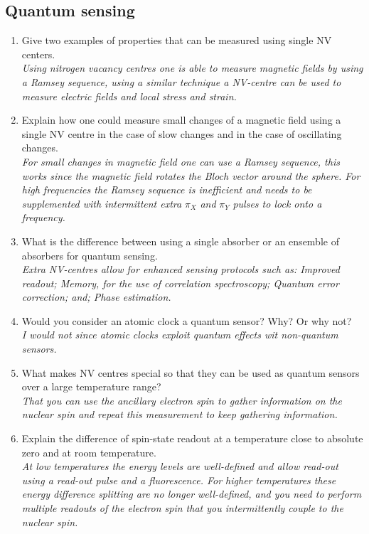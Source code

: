 \documentclass[a4paper]{scrartcl}
\newcommand{\qa}[2]{#1\\ \textit{#2}}
\begin{document}
\subsection*{Quantum sensing}
\begin{enumerate}[label=(\alph*)]
  \item \qa{Give two examples of properties that can be measured using single NV
  centers.}{Using nitrogen vacancy centres one is able to measure magnetic fields by using a Ramsey sequence, using a similar technique a NV-centre can be used to measure electric fields and local stress and strain.}
  \item \qa{Explain how one could measure small changes of a magnetic field using a single NV centre in the case of slow changes and in the case of oscillating changes.}{For small changes in magnetic field one can use a Ramsey sequence, this works since the magnetic field rotates the Bloch vector around the sphere. For high frequencies the Ramsey sequence is inefficient and needs to be supplemented with intermittent extra} $\pi_X$ \textit{and} $\pi_Y$ \textit{pulses to lock onto a frequency.}
  \item \qa{What is the difference between using a single absorber or an ensemble of absorbers for quantum sensing.}{Extra NV-centres allow for enhanced sensing protocols such as: Improved readout; Memory, for the use of correlation spectroscopy; Quantum error correction; and; Phase estimation.}
  \item \qa{Would you consider an atomic clock a quantum sensor? Why? Or why not?}{I would not since atomic clocks exploit quantum effects wit non-quantum sensors.}
  \item \qa{What makes NV centres special so that they can be used as quantum sensors over a large temperature range?}{That you can use the ancillary electron spin to gather information on the nuclear spin and repeat this measurement to keep gathering information.}
  \item \qa{Explain the difference of spin-state readout at a temperature close to absolute zero and at room temperature.}{At low temperatures the energy levels are well-defined and allow read-out using a read-out pulse and a fluorescence. For higher temperatures these energy difference splitting are no longer well-defined, and you need to perform multiple readouts of the electron spin that you intermittently couple to the nuclear spin.}
\end{enumerate}
\end{document}
